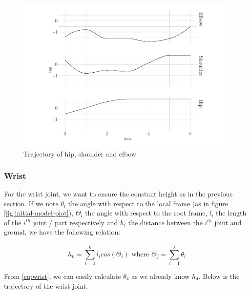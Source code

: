 \documentclass[a4paper, xcolor = usenames,dvipsnames]{article}
\begin{document}
\begin{figure}

{\centering \includegraphics{report_files/figure-latex/traject-hse-plot-1} 

}

\caption{Trajectory of hip, shoulder and elbow}\label{fig:traject-hse-plot}
\end{figure}

\hypertarget{wrist-1}{%
\subsubsection{Wrist}\label{wrist-1}}

For the wrist joint, we want to ensure the constant height as in the previous \protect\hyperlink{the-atlatl-and-the-dart}{section}. If we note \(\theta_{i}\) the angle with respect to the local frame (as in figure \ref{fig:initial-model-plot}), \(\Theta_{i}\) the angle with respect to the root frame, \(l_{i}\) the length of the \(i^{th}\) joint / part respectively and \(h_{i}\) the distance between the \(i^{th}\) joint and ground, we have the following relation:

\begin{equation}
  h_{k} = \sum_{i = 1}^{k} l_{i} cos(\Theta_{i}) \text{ where } \Theta_{j} = \sum_{i = 1}^{j} \theta_{i} \label{eq:wrist}
\end{equation}

From \eqref{eq:wrist}, we can easily calculate \(\theta_4\) as we already know \(h_4\). Below is the trajectory of the wrist joint.
\end{document}
